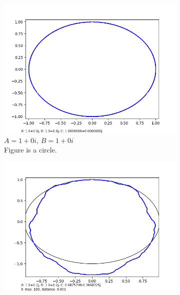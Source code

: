 \documentclass[12pt,a4paper,reqno,parskip=full]{amsart}
\numberwithin{equation}{section}
\theoremstyle{plain}
\theoremstyle{definition}
\begin{document}
\begin{figure}[H]
     \centering
     
     \begin{subfigure}[b]{0.3\textwidth}
         \centering
         \includegraphics[width=\textwidth]{images/nn/a0 b0 h100 d0.001 auto xy.png}
         \caption{$A=1+0i$, $B=1+0i$\\Figure is a circle.}
         \label{fig:circle}
     \end{subfigure}
     \hfill
     \begin{subfigure}[b]{0.3\textwidth}
         \centering
         \includegraphics[width=\textwidth]{images/m/a.2,b.2,h100,d.0010.png}

\end{subfigure}
\end{figure}
\end{document}

